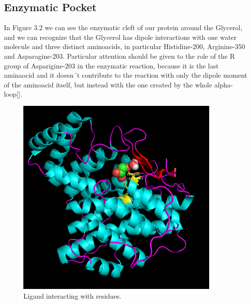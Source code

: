 \documentclass[a4paper,english,12pt,bibliography=totoc]{scrreprt}
\begin{document}
\subsection{Enzymatic Pocket}
In Figure 3.2 we can see the enzymatic cleft of our protein around the Glycerol, and we can recognize that the Glycerol has dipole interactions with one water molecule and three distinct aminoacids, in particular Histidine-200, Arginine-350 and Asparagine-203.
Particular attention should be given to the role of the R group of Asparigine-203 in the enzymatic reaction, because it is the last aminaocid and it doesn´t contribute to the reaction with only the dipole moment of the aminoacid itself, but instead with the one created by the whole alpha-loop[\cite{hol_-helix_1978}].

\begin{figure}[H]
        \centering
        \includegraphics[width=0.9\textwidth]{Project 3/ligand.png}
	    \caption{Ligand interacting with residues. }
\end{figure}
\end{document}
